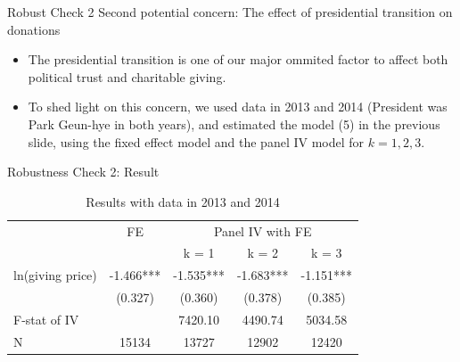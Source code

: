 \documentclass[
  ignorenonframetext,
]{beamer}
\providecommand{\tightlist}{%
  \setlength{\itemsep}{0pt}\setlength{\parskip}{0pt}}
\begin{document}
\begin{frame}{Robust Check 2}
\protect\hypertarget{robust-check-2}{}
Second potential concern: The effect of presidential transition on
donations

\begin{itemize}
\tightlist
\item
  The presidential transition is one of our major ommited factor to
  affect both political trust and charitable giving.
\item
  To shed light on this concern, we used data in 2013 and 2014
  (President was Park Geun-hye in both years), and estimated the model
  (5) in the previous slide, using the fixed effect model and the panel
  IV model for \(k = 1, 2, 3\).
\end{itemize}
\end{frame}

\begin{frame}{Robustness Check 2: Result}
\protect\hypertarget{robustness-check-2-result}{}
\begin{table}

\caption{\label{tab:kableShortEstimateElasticity}Results with data in 2013 and 2014}
\centering
\fontsize{9}{11}\selectfont
\begin{tabular}[t]{lcccc}
\toprule
\multicolumn{1}{c}{ } & \multicolumn{1}{c}{FE} & \multicolumn{3}{c}{Panel IV with FE} \\
\cmidrule(l{3pt}r{3pt}){2-2} \cmidrule(l{3pt}r{3pt}){3-5}
 &  & k = 1 & k = 2 & k = 3\\
\midrule
ln(giving price) & -1.466*** & -1.535*** & -1.683*** & -1.151***\\
 & (0.327) & (0.360) & (0.378) & (0.385)\\
F-stat of IV &  & 7420.10 & 4490.74 & 5034.58\\
N & 15134 & 13727 & 12902 & 12420\\
\bottomrule
\end{tabular}
\end{table}
\end{frame}
\end{document}
